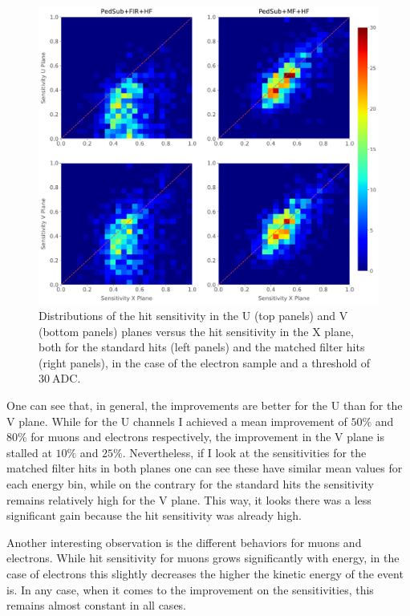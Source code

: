 \begin{figure}[t]
	\centering
	\includegraphics[width=.99\linewidth]{Images/Matched_Filter/hit_study_electron_concurrence}
	\caption[Distributions of the hit sensitivity in the U and V planes versus the sensitivity in the X plane for the standard hits and the matched filter hits in the electron sample.]{Distributions of the hit sensitivity in the U (top panels) and V (bottom panels) planes versus the hit sensitivity in the X plane, both for the standard hits (left panels) and the matched filter hits (right panels), in the case of the electron sample and a threshold of $30 \ \mathrm{ADC}$.}
	\label{fig:electron_concurrence}
\end{figure}

One can see that, in general, the improvements are better for the U than for the V plane. While for the U channels I achieved a mean improvement of $50\%$ and $80\%$ for muons and electrons respectively, the improvement in the V plane is stalled at $10\%$ and $25\%$. Nevertheless, if I look at the sensitivities for the matched filter hits in both planes one can see these have similar mean values for each energy bin, while on the contrary for the standard hits the sensitivity remains relatively high for the V plane. This way, it looks there was a less significant gain because the hit sensitivity was already high.

Another interesting observation is the different behaviors for muons and electrons. While hit sensitivity for muons grows significantly with energy, in the case of electrons this slightly decreases the higher the kinetic energy of the event is. In any case, when it comes to the improvement on the sensitivities, this remains almost constant in all cases.

